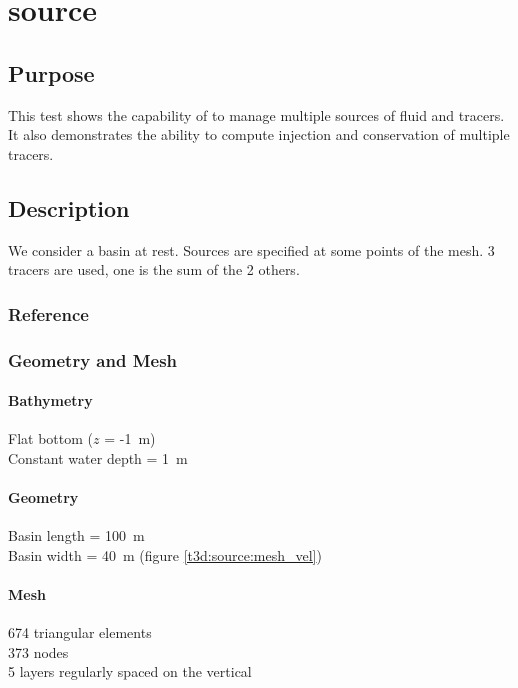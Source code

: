 \chapter{source}
%
%
\section{Purpose}
%
This test shows the capability of  to manage multiple
sources of fluid and tracers.
It also demonstrates the ability to compute injection and conservation
of multiple tracers.
%
\section{Description}
%
We consider a basin at rest.
Sources are specified at some points of the mesh.
3 tracers are used, one is the sum of the 2 others.
%
%
%
%
\subsection{Reference}
%

%
%
%
\subsection{Geometry and Mesh}
%
\subsubsection{Bathymetry}
%
Flat bottom ($z$ = -1~m)\\
Constant water depth = 1~m
%
\subsubsection{Geometry}
%
Basin length = 100~m\\
Basin width = 40~m (figure \ref{t3d:source:mesh_vel})
%
\subsubsection{Mesh}
%
674 triangular elements\\
373 nodes\\
5 layers regularly spaced on the vertical
%
%
%

